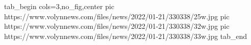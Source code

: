  
 
 
 
 


\ifcmt
  tab_begin cols=3,no_fig,center
     pic https://www.volynnews.com/files/news/2022/01-21/330338/25w.jpg
		 pic https://www.volynnews.com/files/news/2022/01-21/330338/32w.jpg
		 pic https://www.volynnews.com/files/news/2022/01-21/330338/33w.jpg
  tab_end
\fi
